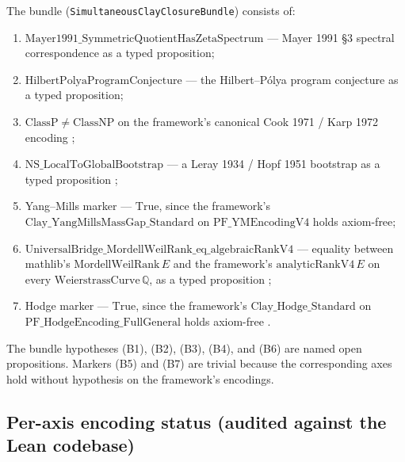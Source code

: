 \documentclass[11pt,a4paper]{article}
\theoremstyle{plain}
\theoremstyle{definition}
\theoremstyle{remark}
\newcommand{\Cstd}[1]{\mathrm{Clay\_#1\_Standard}}
\newcommand{\code}[1]{\texttt{#1}}
\begin{document}
The bundle (\code{SimultaneousClayClosureBundle}) consists of:
\begin{enumerate}[label=(B\arabic*)]
\item $\mathrm{Mayer1991\_SymmetricQuotientHasZetaSpectrum}$
      --- Mayer 1991 \cite{mayer1991} \S3 spectral correspondence
      as a typed proposition;
\item $\mathrm{HilbertPolyaProgramConjecture}$ --- the
      Hilbert--P\'olya program conjecture as a typed proposition;
\item $\mathrm{ClassP} \ne \mathrm{ClassNP}$ on the framework's
      canonical Cook 1971 / Karp 1972 encoding
      \cite{cook1971,karp1972};
\item $\mathrm{NS\_LocalToGlobalBootstrap}$ --- a Leray 1934 /
      Hopf 1951 bootstrap as a typed proposition \cite{beale1984};
\item Yang--Mills marker --- $\mathrm{True}$, since the
      framework's $\Cstd{YangMillsMassGap}$ on
      $\mathrm{PF\_YMEncodingV4}$ holds axiom-free;
\item $\mathrm{UniversalBridge\_MordellWeilRank\_eq\_algebraicRankV4}$
      --- equality between mathlib's
      $\mathrm{MordellWeilRank}\,E$ and the framework's
      $\mathrm{analyticRankV4}\,E$ on every
      $\mathrm{WeierstrassCurve}\,\mathbb{Q}$, as a typed
      proposition \cite{wiles1995modular,gross1986heegner,
      kolyvagin1988finiteness};
\item Hodge marker --- $\mathrm{True}$, since the framework's
      $\Cstd{Hodge}$ on
      $\mathrm{PF\_HodgeEncoding\_FullGeneral}$ holds axiom-free
      \cite{voisin2018}.
\end{enumerate}

\noindent The bundle hypotheses (B1), (B2), (B3), (B4), and
(B6) are named open propositions. Markers (B5) and (B7) are
trivial because the corresponding axes hold without
hypothesis on the framework's encodings.

\subsection*{Per-axis encoding status (audited against the
Lean codebase)}
\end{document}

